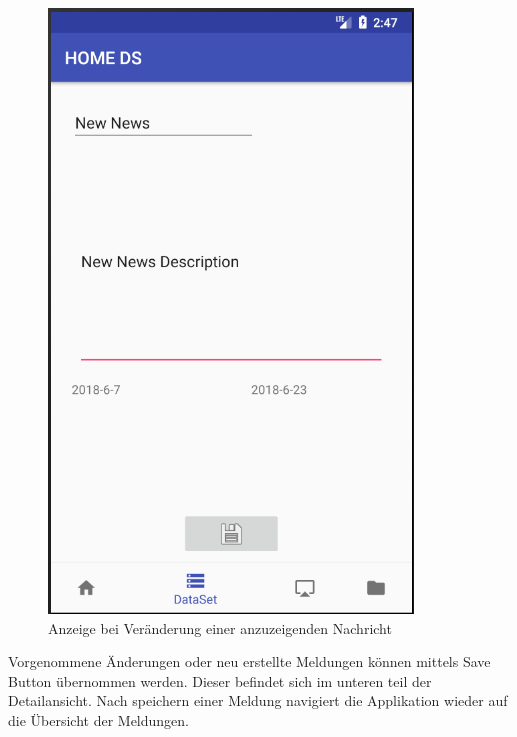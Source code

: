 \begin{figure}[H]
\centering
\includegraphics[scale=0.35]{images/06_AndroidApp/06_EditNews}
\caption{Anzeige bei Veränderung einer anzuzeigenden Nachricht}
\label{fig:mediaNav}
\end{figure}
Vorgenommene Änderungen oder neu erstellte Meldungen können mittels Save Button übernommen werden. Dieser befindet sich im unteren teil der Detailansicht. Nach speichern einer Meldung navigiert die Applikation wieder auf die Übersicht der Meldungen.

